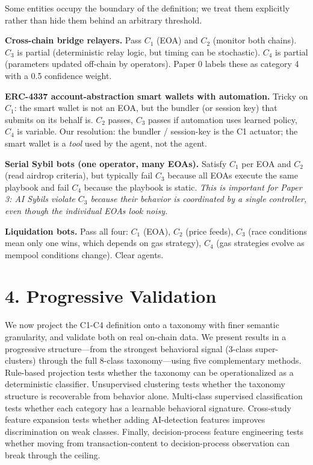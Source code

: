 \documentclass[sigconf,nonacm=false]{acmart}
\begin{document}
Some entities occupy the boundary of the definition; we treat them explicitly rather than hide them behind an arbitrary threshold.

\textbf{Cross-chain bridge relayers.} Pass $C_1$ (EOA) and $C_2$ (monitor both chains). $C_3$ is partial (deterministic relay logic, but timing can be stochastic). $C_4$ is partial (parameters updated off-chain by operators). Paper 0 labels these as category 4 with a 0.5 confidence weight.

\textbf{ERC-4337 account-abstraction smart wallets with automation.} Tricky on $C_1$: the smart wallet is not an EOA, but the bundler (or session key) that submits on its behalf is. $C_2$ passes, $C_3$ passes if automation uses learned policy, $C_4$ is variable. Our resolution: the bundler / session-key is the C1 actuator; the smart wallet is a \textit{tool} used by the agent, not the agent.

\textbf{Serial Sybil bots (one operator, many EOAs).} Satisfy $C_1$ per EOA and $C_2$ (read airdrop criteria), but typically fail $C_3$ because all EOAs execute the same playbook and fail $C_4$ because the playbook is static. \textit{This is important for Paper 3: AI Sybils violate $C_3$ because their behavior is coordinated by a single controller, even though the individual EOAs look noisy.}

\textbf{Liquidation bots.} Pass all four: $C_1$ (EOA), $C_2$ (price feeds), $C_3$ (race conditions mean only one wins, which depends on gas strategy), $C_4$ (gas strategies evolve as mempool conditions change). Clear agents.


\section{4. Progressive Validation}

We now project the C1-C4 definition onto a taxonomy with finer semantic granularity, and validate both on real on-chain data. We present results in a progressive structure---from the strongest behavioral signal (3-class super-clusters) through the full 8-class taxonomy---using five complementary methods. Rule-based projection tests whether the taxonomy can be operationalized as a deterministic classifier. Unsupervised clustering tests whether the taxonomy structure is recoverable from behavior alone. Multi-class supervised classification tests whether each category has a learnable behavioral signature. Cross-study feature expansion tests whether adding AI-detection features improves discrimination on weak classes. Finally, decision-process feature engineering tests whether moving from transaction-content to decision-process observation can break through the ceiling.
\end{document}
